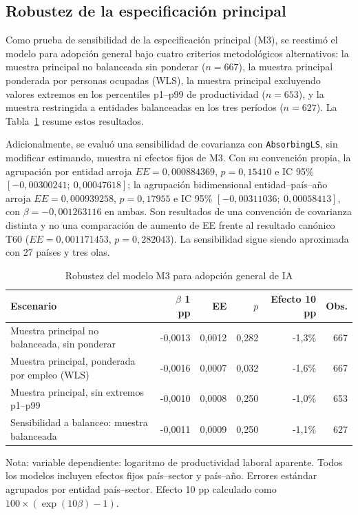 \documentclass[12pt,a4paper]{article}
\begin{document}
\subsection{Robustez de la especificación principal}

Como prueba de sensibilidad de la especificación principal (M3), se reestimó el modelo para adopción general bajo cuatro criterios metodológicos alternativos: la muestra principal no balanceada sin ponderar ($n=667$), la muestra principal ponderada por personas ocupadas (WLS), la muestra principal excluyendo valores extremos en los percentiles p1--p99 de productividad ($n=653$), y la muestra restringida a entidades balanceadas en los tres períodos ($n=627$). La Tabla~\ref{tab:robustez-adopcion} resume estos resultados.

Adicionalmente, se evaluó una sensibilidad de covarianza con \texttt{AbsorbingLS}, sin modificar estimando, muestra ni efectos fijos de M3. Con su convención propia, la agrupación por entidad arroja $EE=0,000884369$, $p=0,15410$ e IC 95\% $[-0,00300241;\ 0,00047618]$; la agrupación bidimensional entidad--país--año arroja $EE=0,000939258$, $p=0,17955$ e IC 95\% $[-0,00311036;\ 0,00058413]$, con $\beta=-0,001263116$ en ambas. Son resultados de una convención de covarianza distinta y no una comparación de aumento de EE frente al resultado canónico T60 ($EE=0,001171453$, $p=0,282043$). La sensibilidad sigue siendo aproximada con 27 países y tres olas.

\begin{table}[H]
\centering
\renewcommand{\arraystretch}{0.80}
\setlength{\tabcolsep}{3.5pt}
\centering
\caption{Robustez del modelo M3 para adopción general de IA}
\label{tab:robustez-adopcion}
\small
\begin{tabularx}{\textwidth}{Xrrrrr}
\toprule
\textbf{Escenario} & \textbf{$\beta$ 1 pp} & \textbf{EE} & \textbf{$p$} & \textbf{Efecto 10 pp} & \textbf{Obs.} \\
\midrule
Muestra principal no balanceada, sin ponderar & -0,0013 & 0,0012 & 0,282 & -1,3\% & 667 \\
Muestra principal, ponderada por empleo (WLS) & -0,0016 & 0,0007 & 0,032 & -1,6\% & 667 \\
Muestra principal, sin extremos p1--p99 & -0,0010 & 0,0008 & 0,250 & -1,0\% & 653 \\
Sensibilidad a balanceo: muestra balanceada & -0,0011 & 0,0009 & 0,250 & -1,1\% & 627 \\
\bottomrule
\end{tabularx}
\begin{flushleft}
\footnotesize Nota: variable dependiente: logaritmo de productividad laboral aparente. Todos los modelos incluyen efectos fijos país--sector y país--año. Errores estándar agrupados por entidad país--sector. Efecto 10 pp calculado como $100\times(\exp(10\beta)-1)$.
\end{flushleft}
\end{table}
\end{document}
